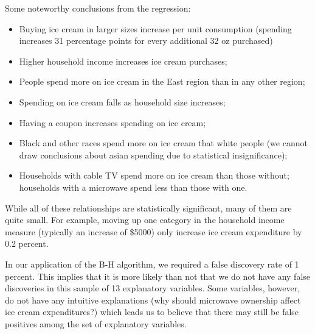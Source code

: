\documentclass[11pt, fleqn]{article}
\begin{document}
Some noteworthy conclusions from the regression:
\begin{itemize}
  \item Buying ice cream in larger sizes increase per unit consumption (spending increases 31 percentage points for every additional 32 oz purchased)
  \item Higher household income increases ice cream purchases;
  \item People spend more on ice cream in the East region than in any other region;
  \item Spending on ice cream falls as household size increases;
  \item Having a coupon increases spending on ice cream;
  \item Black and other races spend more on ice cream that white people (we cannot draw conclusions about asian spending due to statistical insignificance);
  \item Households with cable TV spend more on ice cream than those without; households with a microwave spend less than those with one.
\end{itemize}

While all of these relationships are statistically significant, many of them are quite small. For example, moving up one category in the household income measure (typically an increase of \$5000) only increase ice cream expenditure by 0.2 percent.

In our application of the B-H algorithm, we required a false discovery rate of 1 percent. This implies that it is more likely than not that we do not have any false discoveries in this sample of 13 explanatory variables. Some variables, however, do not have any intuitive explanations (why should microwave ownership affect ice cream expenditures?) which leads us to believe that there may still be false positives among the set of explanatory variables.
\end{document}

